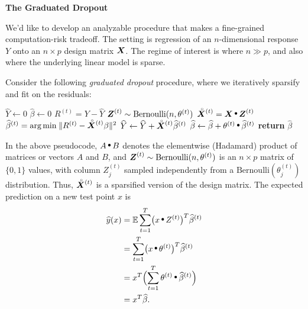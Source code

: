 \documentclass[12pt]{imsart}
\numberwithin{equation}{section}
\theoremstyle{plain}
\theoremstyle{remark}
\def\mbf#1{\mbox{\boldmath$#1$}}
\def\E{{\mathbb E}}
\def\argmin{\mathop{\text{\rm arg\,min}}}
\let\hat\widehat
\let\hat\widehat
\let\hat\widehat
\def\E{{\mathbb E}}
\def\argmin{\mathop{\text{arg\,min}\kern.2ex}}
\let\hat\widehat
\def\betas#1{\widehat\beta^{(#1)}}
\def\thetas#1{\theta^{(#1)}}
\def\Rs#1{{R}^{(#1)}}
\def\Zs#1{\mbf{Z}^{(#1)}}
\def\X{\mbf{X}}
\def\Xs#1{\accentset{\;\circ}{\mbf{X}}^{(#1)}}
\def\hadamard{\mathop{\raise.5ex\hbox{$\scriptstyle\bullet$}}}
\begin{document}
\begin{frontmatter}
{\bf The Graduated Dropout}
\end{frontmatter}

\par


We'd like to develop an analyzable procedure that makes a fine-grained computation-risk
tradeoff.   The setting is regression of an $n$-dimensional response $Y$ onto an $n\times p$ design matrix $\X$.
The regime of interest is where $n \gg p$, and also where the
underlying linear model is sparse.

Consider the following \textit{graduated dropout} procedure, where we iteratively
sparsify and fit on the residuals:

\begin{center}
\begin{minipage}{.5\columnwidth}
\begin{algorithmic}[1]
\Procedure{GraduatedDropout}{$\X,Y$}
   \State $\hat Y \gets 0$
   \State $\hat\beta \gets 0$
      \State $\Rs{t} = Y - \hat Y$
      \State $\Zs{t} \sim \text{Bernoulli}(n, \thetas{t})$
      \State $\Xs{t} = \X \hadamard \Zs{t}$
      \State $\betas{t} = \argmin \|\Rs{t} - \Xs{t} \beta\|^2$
      \State $\hat Y \gets \hat Y + \Xs{t} \betas{t}$
      \State $\hat \beta \gets \hat\beta + \thetas{t} \hadamard \betas{t}$
   \EndFor
   \State \textbf{return} $\hat\beta$
\EndProcedure
\end{algorithmic}
\end{minipage}
\end{center}

In the above pseudocode, $A\hadamard B$ denotes the elementwise
(Hadamard) product of matrices or vectors $A$ and $B$, and $\Zs{t} \sim \text{Bernoulli}(n, \thetas{t})$
is an $n\times p$ matrix of $\{0,1\}$ values, with column $Z_j^{(t)}$ sampled
independently from a $\text{Bernoulli}(\thetas{t}_j)$ distribution.
Thus, $\Xs{t}$ is a sparsified version of the design matrix.
The expected prediction on a new test point $x$ is
\begin{align}
\hat y(x) & = \E \sum_{t=1}^T \bigl(x\hadamard Z^{(t)}\bigr)^T \betas{t} \\
& = \sum_{t=1}^T \bigl(x\hadamard \thetas{t}\bigl)^T \betas{t} \\
& =  x^T \Bigl(\sum_{t=1}^T \thetas{t}\hadamard \betas{t}\Bigr) \\
& = x^T \hat \beta.
\end{align}
\end{document}
